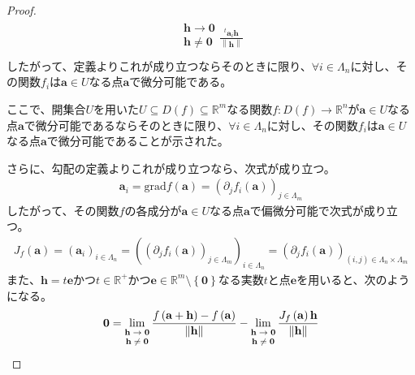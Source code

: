 \documentclass[dvipdfmx]{jsarticle}
\begin{document}
\begin{proof}
\begin{align*}
{\begin{matrix}
\mathbf{h} \rightarrow \mathbf{0} \\
\mathbf{h} \neq \mathbf{0} \\
\end{matrix}}\frac{{}^{t}\mathbf{a}_{i}\mathbf{h}}{\left\| \mathbf{h} \right\|}
\end{align*}
したがって、定義よりこれが成り立つならそのときに限り、$\forall i \in \varLambda_{n}$に対し、その関数$f_{i}$は$\mathbf{a} \in U$なる点$\mathbf{a}$で微分可能である。\par
ここで、開集合$U$を用いた$U \subseteq D(f) \subseteq \mathbb{R}^{m}$なる関数$f:D(f) \rightarrow \mathbb{R}^{n}$が$\mathbf{a} \in U$なる点$\mathbf{a}$で微分可能であるならそのときに限り、$\forall i \in \varLambda_{n}$に対し、その関数$f_{i}$は$\mathbf{a} \in U$なる点$\mathbf{a}$で微分可能であることが示された。\par
さらに、勾配の定義よりこれが成り立つなら、次式が成り立つ。
\begin{align*}
\mathbf{a}_{i} = \mathrm{grad}f\left( \mathbf{a} \right) = \left( \partial_{j}f_{i}\left( \mathbf{a} \right) \right)_{j \in \varLambda_{m}}
\end{align*}
したがって、その関数$f$の各成分が$\mathbf{a} \in U$なる点$\mathbf{a}$で偏微分可能で次式が成り立つ。
\begin{align*}
J_{f}\left( \mathbf{a} \right) = \left( \mathbf{a}_{i} \right)_{i \in \varLambda_{n}} = \left( \left( \partial_{j}f_{i}\left( \mathbf{a} \right) \right)_{j \in \varLambda_{m}} \right)_{i \in \varLambda_{n}} = \left( \partial_{j}f_{i}\left( \mathbf{a} \right) \right)_{(i,j) \in \varLambda_{n} \times \varLambda_{m}}
\end{align*}
また、$\mathbf{h} = t\mathbf{e}$かつ$t \in \mathbb{R}^{+}$かつ$\mathbf{e} \in \mathbb{R}^{m} \setminus \left\{ \mathbf{0} \right\}$なる実数$t$と点$\mathbf{e}$を用いると、次のようになる。
\begin{align*}
\mathbf{0} &= \lim_{\scriptsize \begin{matrix}
\mathbf{h} \rightarrow \mathbf{0} \\
\mathbf{h} \neq \mathbf{0} \\
\end{matrix}}\frac{f\left( \mathbf{a} + \mathbf{h} \right) - f\left( \mathbf{a} \right)}{\left\| \mathbf{h} \right\|} - \lim_{\scriptsize \begin{matrix}
\mathbf{h} \rightarrow \mathbf{0} \\
\mathbf{h} \neq \mathbf{0} \\
\end{matrix}}\frac{J_{f}\left( \mathbf{a} \right)\mathbf{h}}{\left\| \mathbf{h} \right\|}\\

\end{align*}
\end{proof}
\end{document}
